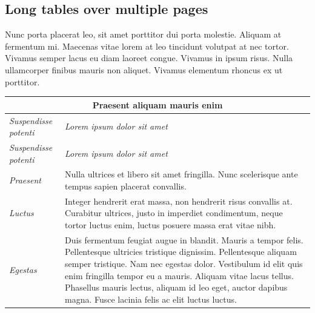		\subsection{Long tables over multiple pages}

		Nunc porta placerat leo, sit amet porttitor dui porta molestie. Aliquam at fermentum mi. Maecenas vitae lorem at leo tincidunt volutpat at nec tortor. Vivamus semper lacus eu diam laoreet congue. Vivamus in ipsum risus. Nulla ullamcorper finibus mauris non aliquet. Vivamus elementum rhoncus ex ut porttitor.

		\begin{center}
			\begin{longtable}{ | p{} | p{} | }
				
				\hline
				\multicolumn{2}{|c|}{\textbf{Praesent aliquam mauris enim}}
				\\ \hline
				
				\emph{Suspendisse potenti} & \emph{Lorem ipsum dolor sit amet}
				\\ \hline \hline
				\endfirsthead %
				
				\hline
				\emph{Suspendisse potenti} & \emph{Lorem ipsum dolor sit amet}
				\\ \hline \hline
				\endhead %
				
				\hline
				\endfoot %
				
				\endlastfoot %
				
				\emph{Praesent}
				& Nulla ultrices et libero sit amet fringilla. Nunc scelerisque ante tempus sapien placerat convallis.
				\\ \hline
				
				\emph{Luctus}
				& Integer hendrerit erat massa, non hendrerit risus convallis at. Curabitur ultrices, justo in imperdiet condimentum, neque tortor luctus enim, luctus posuere massa erat vitae nibh.
				\\ \hline
				
				\emph{Egestas}
				& Duis fermentum feugiat augue in blandit. Mauris a tempor felis. Pellentesque ultricies tristique dignissim. Pellentesque aliquam semper tristique. Nam nec egestas dolor. Vestibulum id elit quis enim fringilla tempor eu a mauris. Aliquam vitae lacus tellus. Phasellus mauris lectus, aliquam id leo eget, auctor dapibus magna. Fusce lacinia felis ac elit luctus luctus.
				\\ \hline
				

\end{longtable}
\end{center}
